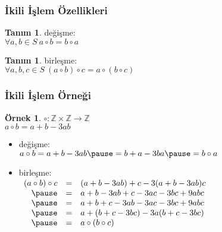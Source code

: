 \documentclass[dvipsnames]{beamer}
\theoremstyle{definition}
\newtheorem{tanim}[theorem]{Tanım}
\theoremstyle{example}
\newtheorem{ornek}[theorem]{Örnek}
\theoremstyle{plain}
\begin{document}
\begin{frame}
  \frametitle{İkili İşlem Özellikleri}

  \begin{tanim}
    \alert{değişme}:\\
    $\forall a,b \in S~a \circ b = b \circ a$
  \end{tanim}

  \pause
  \begin{tanim}
    \alert{birleşme}:\\
    $\forall a,b,c \in S~(a \circ b) \circ c = a \circ (b \circ c)$
  \end{tanim}
\end{frame}

\begin{frame}
  \frametitle{İkili İşlem Örneği}

  \begin{ornek}
    $\circ: \mathbb{Z} \times \mathbb{Z} \rightarrow \mathbb{Z}$\\
    $a \circ b = a + b - 3ab$

    \pause
    \medskip
    \begin{itemize}
      \item değişme:\\
        $a \circ b = a + b - 3ab \pause
                   = b + a - 3ba \pause
                   = b \circ a$

      \pause
      \medskip
      \item birleşme:\\
        $\begin{array}{rcl}
          (a \circ b) \circ c & = & (a + b - 3ab) + c - 3 (a + b - 3ab) c\\ \pause
                              & = & a + b - 3ab + c - 3ac - 3bc + 9abc\\ \pause
                              & = & a + b + c - 3ab - 3ac - 3bc + 9abc\\ \pause
                              & = & a + (b + c - 3bc) - 3 a (b + c - 3bc)\\ \pause
                              & = & a \circ (b \circ c)
        \end{array}$
     \end{itemize}
 \end{ornek}
\end{frame}
\end{document}
